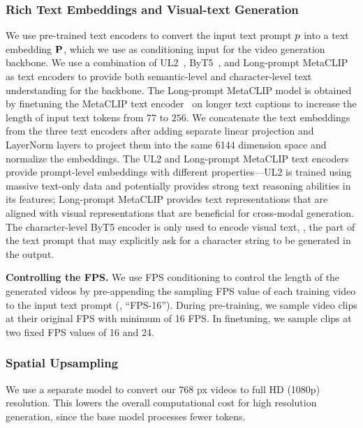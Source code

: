 \subsubsection{Rich Text Embeddings and Visual-text Generation} %
\label{sec:t2v_text_encoder}
We use pre-trained text encoders to convert the input text prompt $p$ into a text embedding $\mathbf{P}$, which we use as conditioning input for the video generation backbone.
We use a combination of UL2~\citep{tay2022ul2}, ByT5~\citep{xue2022byt5}, and Long-prompt MetaCLIP as text encoders to provide both semantic-level and character-level text understanding for the backbone.
The Long-prompt MetaCLIP model is obtained by finetuning the MetaCLIP text encoder~\citep{xu2023demystifying} on longer text captions to increase the length of input text tokens from $77$ to $256$.
We concatenate the text embeddings from the three text encoders after adding separate linear projection and LayerNorm layers to project them into the same 6144 dimension space and normalize the embeddings.
The UL2 and Long-prompt MetaCLIP text encoders provide prompt-level embeddings with different properties---UL2 is trained using massive text-only data and potentially provides strong text reasoning abilities in its features;
Long-prompt MetaCLIP provides text representations that are aligned with visual representations that are beneficial for cross-modal generation.
The character-level ByT5 encoder is only used to encode visual text, \ie, the part of the text prompt that may explicitly ask for a character string to be generated in the output.


\noindent \textbf{Controlling the FPS.}
We use FPS conditioning to control the length of the generated videos by pre-appending the sampling FPS value of each training video to the input text prompt (\eg, ``FPS-16''). During pre-training, we sample video clips at their original FPS with minimum of 16 FPS. In finetuning, we sample clips at two fixed FPS values of 16 and 24.







\subsubsection{Spatial Upsampling} \label{sec:spatial_upsampler}
We use a separate \upsampler model to convert our $768$ px videos to full HD (1080p) resolution.
This lowers the overall computational cost for high resolution generation, since the base \textToV model processes fewer tokens.

